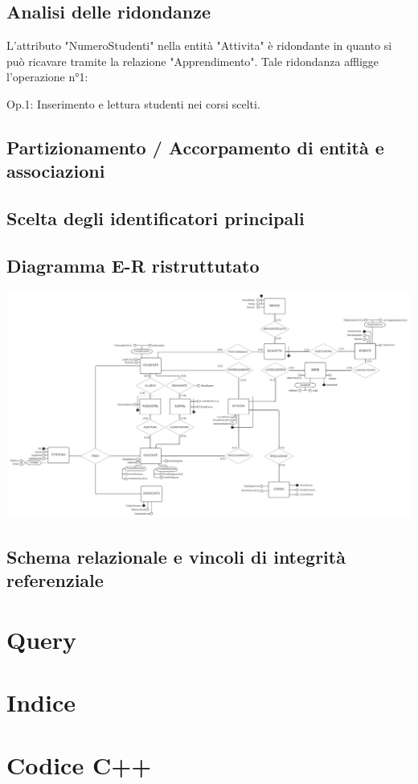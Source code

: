 \documentclass[11pt]{article}
\begin{document}
	\subsection{Analisi delle ridondanze}
		L'attributo "NumeroStudenti" nella entità "Attivita" è ridondante in quanto si può ricavare tramite la relazione "Apprendimento".
		Tale ridondanza affligge l'operazione n°1:
		
		Op.1: Inserimento e lettura studenti nei corsi scelti.
	\subsection{Partizionamento / Accorpamento di entità e associazioni}
	\subsection{Scelta degli identificatori principali}
	\subsection{Diagramma E-R ristruttutato}
		\includegraphics[scale=0.55]{../SchemaConcettuale/ER-LUCIDCHART - ER-concettuale 2.jpeg}
	\subsection{Schema relazionale e vincoli di integrità referenziale}
\section{Query}
\section{Indice}
\section{Codice C++}
\end{document}
